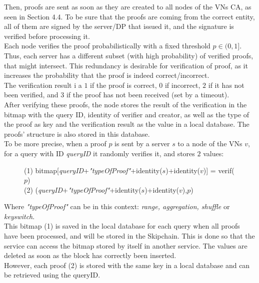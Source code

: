 \documentclass{article}
\begin{document}
Then, proofs are sent as soon as they are created to all nodes of the VNs CA, as seen in Section 4.4. To be sure that the proofs are coming from the correct entity, all of them are signed by the server/DP that issued it, and the signature is verified before processing it.\\
Each node verifies the proof probabilistically with a fixed threshold $p \in (0,1]$. Thus, each server has a different subset (with high probability) of verified proofs, that might intersect. This redundancy is desirable for verification of proof, as it increases the probability that the proof is indeed correct/incorrect.\\
The verification result i a $1$ if the proof is correct, $0$ if incorrect, $2$ if it has not been verified, and 3 if the proof has not been received (set by a timeout).\\
After verifying these proofs, the node stores the result of the verification in the bitmap with the query ID, identity of verifier and creator, as well as the type of the proof as key and the verification result as the value in a local database. The proofs' structure is also stored in this database.\\

To be more precise, when a proof $p$ is sent by a server $s$ to a node of the VNs $v$, for a query with ID \textit{queryID} it randomly verifies it, and stores $2$ values:\\
\begin{figure}[H]
\center
(1) bitmap[\textit{queryID}+\textit{"typeOfProof"}+identity($s$)+identity($v$)] = verif($p$)\\
(2) (\textit{queryID}+\textit{"typeOfProof"}+identity($s$)+identity($v$),$p$)
\end{figure}
Where \textit{"typeOfProof"} can be in this context: \textit{range, aggregation, shuffle} or \textit{keyswitch}.\\
This bitmap (1) is saved in the local database for each query when all proofs have been processed, and will be stored in the Skipchain. This is done so that the service can access the bitmap stored by itself in another service. The values are deleted as  soon as the block has correctly been inserted.\\
However, each proof (2) is stored with the same key in a local database and can be retrieved using the queryID.\\
\end{document}
